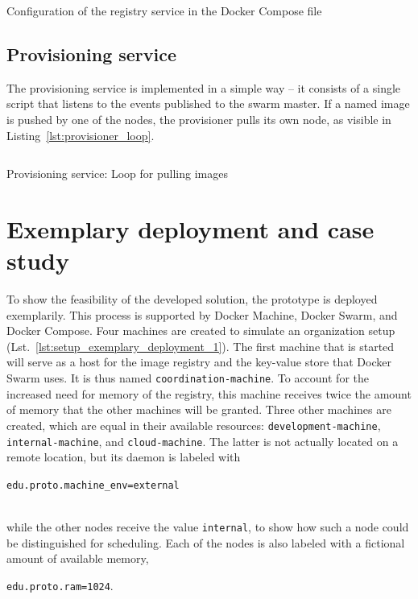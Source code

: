     \begin{listing}[!b]
      \inputminted[firstline=12,lastline=21,fontsize=\footnotesize,linenos=true,numberblanklines=true,showspaces=false,breaklines=true,baselinestretch=1]{yaml}{../code/wfms.yml}
      \caption{Configuration of the registry service in the Docker Compose file}
      \label{lst:configuration_of_the_registry_service_in_the_docker_compose_file}
    \end{listing}

  \subsection{Provisioning service} %
    \label{sub:provisioning_service}
      The provisioning service is implemented in a simple way -- it consists of a single script that listens to the events published to the swarm master. If a named image is pushed by one of the nodes, the provisioner pulls its own node, as visible in Listing~\ref{lst:provisioner_loop}.

      \begin{listing}[!t]
        \inputminted[firstline=19,lastline=29,fontsize=\footnotesize,linenos=true,numberblanklines=true,showspaces=false,breaklines=true,baselinestretch=1]{ruby}{../code/provisioner/provisioner.rb}
        \caption{Provisioning service: Loop for pulling images}
        \label{lst:provisioner_loop}
      \end{listing}


\section{Exemplary deployment and case study} %
\label{sec:exemplary_deployment}
  To show the feasibility of the developed solution, the prototype is deployed exemplarily. This process is supported by Docker Machine, Docker Swarm, and Docker Compose. Four machines are created to simulate an organization setup (Lst.~\ref{lst:setup_exemplary_deployment_1}). The first machine that is started will serve as a host for the image registry and the key-value store that Docker Swarm uses. It is thus named \texttt{coordination-machine}. To account for the increased need for memory of the registry, this machine receives twice the amount of memory that the other machines will be granted. Three other machines are created, which are equal in their available resources: \texttt{development-machine}, \texttt{internal-machine}, and \texttt{cloud-machine}. The latter is not actually located on a remote location, but its daemon is labeled with
  \\ [0.5ex]
  \centerline{\texttt{edu.proto.machine\_env=external}}
  \\ [0.5ex]
  while the other nodes receive the value \texttt{internal}, to show how such a node could be distinguished for scheduling. Each of the nodes is also labeled with a fictional amount of available memory, \eg
  \\ [0.5ex]
  \centerline{\texttt{edu.proto.ram=1024}.}
  \\ [0.5ex]

